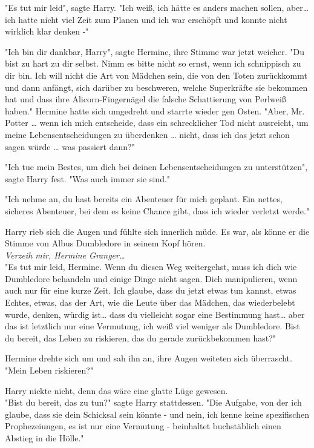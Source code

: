 {"Es tut mir leid", sagte Harry. "Ich weiß, ich hätte es anders machen sollen, aber… ich hatte nicht viel Zeit zum Planen und ich war erschöpft und konnte nicht wirklich klar denken -"

"Ich bin dir dankbar, Harry", sagte Hermine, ihre Stimme war jetzt weicher. "Du bist zu hart zu dir selbst. Nimm es bitte nicht so ernst, wenn ich schnippisch zu dir bin. Ich will nicht die Art von Mädchen sein, die von den Toten zurückkommt und dann anfängt, sich darüber zu beschweren, welche Superkräfte sie bekommen hat und dass ihre Alicorn-Fingernägel die falsche Schattierung von Perlweiß haben." Hermine hatte sich umgedreht und starrte wieder gen Osten. "Aber, Mr. Potter … wenn ich mich entscheide, dass ein schrecklicher Tod nicht ausreicht, um meine Lebensentscheidungen zu überdenken … nicht, dass ich das jetzt schon sagen würde … was passiert dann?"

"Ich tue mein Bestes, um dich bei deinen Lebensentscheidungen zu unterstützen", sagte Harry fest. "Was auch immer sie sind."

"Ich nehme an, du hast bereits ein Abenteuer für mich geplant. Ein nettes, sicheres Abenteuer, bei dem es keine Chance gibt, dass ich wieder verletzt werde."

Harry rieb sich die Augen und fühlte sich innerlich müde. Es war, als könne er die Stimme von Albus Dumbledore in seinem Kopf hören.\\ \emph{Verzeih mir, Hermine Granger…}\\ "Es tut mir leid, Hermine. Wenn du diesen Weg weitergehst, muss ich dich wie Dumbledore behandeln und einige Dinge nicht sagen. Dich manipulieren, wenn auch nur für eine kurze Zeit. Ich glaube, dass du jetzt etwas tun kannst, etwas Echtes, etwas, das der Art, wie die Leute über das Mädchen, das wiederbelebt wurde, denken, würdig ist… dass du vielleicht sogar eine Bestimmung hast… aber das ist letztlich nur eine Vermutung, ich weiß viel weniger als Dumbledore. Bist du bereit, das Leben zu riskieren, das du gerade zurückbekommen hast?"

Hermine drehte sich um und sah ihn an, ihre Augen weiteten sich überrascht. "Mein Leben riskieren?"

Harry nickte nicht, denn das wäre eine glatte Lüge gewesen.\\ "Bist du bereit, das zu tun?" sagte Harry stattdessen. "Die Aufgabe, von der ich glaube, dass sie dein Schicksal sein könnte - und nein, ich kenne keine spezifischen Prophezeiungen, es ist nur eine Vermutung - beinhaltet buchstäblich einen Abstieg in die Hölle."

}
